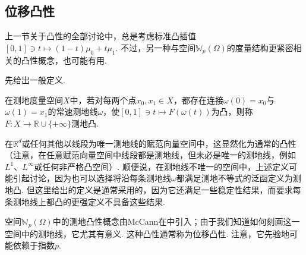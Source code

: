 \subsection{位移凸性}\label{sec:7.3}
上一节关于凸性的全部讨论中，总是考虑标准凸插值$[0,1]\ni t\mapsto(1-t)\mu_0+t\mu_1$. 不过，另一种与空间$\mathbb W_p(\Omega)$的度量结构更紧密相关的凸性概念，也可能有用.

先给出一般定义.
\begin{definition}\label{obj:7.23}
在测地度量空间$X$中，若对每两个点$x_0,x_1\in X$，都存在连接$\omega(0)=x_0$与$\omega(1)=x_1$的常速测地线$\omega$，使$[0,1]\ni t\mapsto F(\omega(t))$为凸，则称$F:X\to\mathbb R\cup\{+\infty\}$测地凸.
\end{definition}
在$\mathbb R^d$或任何其他以线段为唯一测地线的赋范向量空间中，这显然化为通常的凸性（注意，在任意赋范向量空间中线段都是测地线，但未必是唯一的测地线，例如$L^1$、$L^\infty$或任何非严格凸空间）. 顺便说，在测地线不唯一的空间中，上述定义可能引起讨论，因为也可以选择将沿每条测地线$\omega$都满足测地不等式的泛函定义为测地凸. 但这里给出的定义是通常采用的，因为它还满足一些稳定性结果，而要求每条测地线上都凸的更强定义不具备这些结果.

空间$\mathbb W_p(\Omega)$中的测地凸性概念由McCann在\cite{b229}中引入；由于我们知道如何刻画这一空间中的测地线，它尤其有意义. 这种凸性通常称为位移凸性. 注意，它先验地可能依赖于指数$p$.

